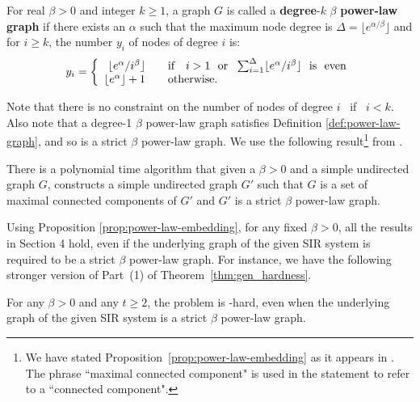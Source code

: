 \begin{definition} \label{def:degree-power-law-graph}
For real $\beta > 0$ and integer $k \geq 1$, a graph $G$ is called
a \textbf{degree}-$k$ $\beta$  \textbf{power-law graph} if there exists an
$\alpha$ such that the maximum node degree is $\Delta = \lfloor
e^{\alpha/\beta} \rfloor$ and for $i \geq k$, the number $y_i$ of nodes
of degree $i$ is:
\[
y_i = \left\{ \begin{array}{r@{\quad \quad}l}
\lfloor e^{\alpha} / i^{\beta} \rfloor  & \mbox{if}~~~  i > 1~  ~\mbox{or}~~
\sum_{i=1}^{\Delta}  \lfloor e^{\alpha} / i^{\beta} \rfloor  ~~\mbox{is~ even}   \\
\lfloor e^{\alpha} \rfloor  + 1 & \mbox{otherwise}.
\end{array} \right.
\]
\end{definition}
Note that there is no constraint on the number of nodes of degree
$i$ ~if~ $i < k$.  Also note that a degree-1 $\beta$ power-law graph
satisfies Definition \ref{def:power-law-graph}, and so is a strict
$\beta$ power-law graph.
We use the following result\footnote{We have stated
Proposition~\ref{prop:power-law-embedding} as it appears
in \cite{ferrante_etal_2008,shen_etal_2012}.
The phrase ``maximal connected component" is used in the statement
to refer to a ``connected component".}
from \cite{ferrante_etal_2008,shen_etal_2012}.

\begin{proposition}  \label{prop:power-law-embedding}
There is a polynomial time algorithm that given a $\beta >0$ and a
simple undirected graph $G$, constructs a simple undirected graph
$G'$ such that $G$ is a set of maximal connected components of $G'$ and
$G'$ is a strict $\beta$  power-law graph.
\end{proposition}   

Using Proposition \ref{prop:power-law-embedding}, for any fixed
$\beta > 0$, all the results in Section 4 hold, even if the underlying
graph of the given SIR system is required to be a  strict $\beta$
power-law graph.  For instance, we have the following stronger
version of Part~(1) of Theorem~\ref{thm:gen_hardness}.

\newcommand{\calsp}{\mbox{$\mathcal{S}'$}}  

\begin{theorem}\label{thm:hardness_power_law}
For any $\beta > 0$ and any $t \geq 2$, the \tNewInfv{} problem is
\cnump-hard, even when the underlying graph of the given SIR system
is a  strict $\beta$  power-law graph.
\end{theorem}

